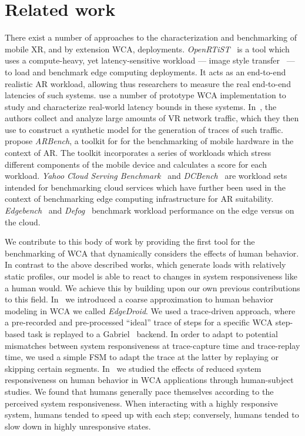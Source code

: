 \section{Related work}\label{sec:relwork}

There exist a number of approaches to the characterization and benchmarking of mobile \ac{XR}, and by extension \ac{WCA}, deployments.
\emph{OpenRTiST}~\cite{george2020openrtist} is a tool which uses a compute-heavy, yet latency-sensitive workload --- image style transfer~\cite{jing2019neural} --- to load and benchmark edge computing deployments.
It acts as an end-to-end realistic \ac{AR} workload, allowing thus researchers to measure the real end-to-end latencies of such systems.
\textcite{Chen2017Empirical} use a number of prototype \ac{WCA} implementation to study and characterize real-world latency bounds in these systems.
In~\cite{lecci2021open}, the authors collect and analyze large amounts of \ac{VR} network traffic, which they then use to construct a synthetic model for the generation of traces of such traffic.
\textcite{chetoui2022arbench} propose \emph{ARBench}, a toolkit for for the benchmarking of mobile hardware in the context of \ac{AR}.
The toolkit incorporates a series of workloads which stress different components of the mobile device and calculates a score for each workload.
\emph{Yahoo Cloud Serving Benchmark}~\cite{cooper2010benchmarking} and \emph{DCBench}~\cite{jia2013characterizing} are workload sets intended for benchmarking cloud services which have further been used in the context of benchmarking edge computing infrastructure for \ac{AR} suitability.
\emph{Edgebench}~\cite{das2018edgebench} and \emph{Defog}~\cite{mcchesney2019defog} benchmark workload performance on the edge versus on the cloud.

We contribute to this body of work by providing the first tool for the benchmarking of \ac{WCA} that dynamically considers the effects of human behavior.
In contrast to the above described works, which generate loads with relatively static profiles, our model is able to react to changes in system responsiveness like a human would.
We achieve this by building upon our own previous contributions to this field.
In~\cite{olguin2018scaling,olguin2019edgedroid} we introduced a coarse approximation to human behavior modeling in \ac{WCA} we called \emph{EdgeDroid}.
We used a trace-driven approach, where a pre-recorded and pre-processed ``ideal'' trace of steps for a specific \ac{WCA} step-based task is replayed to a Gabriel~\cite{Chen2018application} backend.
In order to adapt to potential mismatches between system responsiveness at trace-capture time and trace-replay time, we used a simple \ac{FSM} to adapt the trace at the latter by replaying or skipping certain segments.
In~\cite{olguinmunoz:impact2021} we studied the effects of reduced system responsiveness on human behavior in \ac{WCA} applications through human-subject studies.
We found that humans generally pace themselves according to the perceived system responsiveness.
When interacting with a highly responsive system, humans tended to speed up with each step; conversely, humans tended to slow down in highly unresponsive states.

